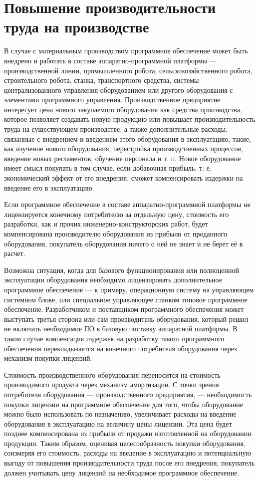 \documentclass{article}
\begin{document}
\section*{Повышение производительности труда на производстве}

В случае с материальным производством программное обеспечение может быть внедрено и работать в составе аппаратно-программной платформы — производственной линии, промышленного робота, сельскохозяйственного робота, строительного робота, станка, транспортного средства, системы централизованного управления оборудованием или другого оборудования с элементами программного управления. Производственное предприятие интересует цена нового закупаемого оборудования как средства производства, которое позволяет создавать новую продукцию или повышает производительность труда на существующем производстве, а также дополнительные расходы, связанные с внедрением и введением этого оборудования в эксплуатацию, такие, как изучение нового оборудования, перестройка производственных процессов, введение новых регламентов, обучение персонала и т. п. Новое оборудование имеет смысл покупать в том случае, если добавочная прибыль, т. е. экономический эффект от его внедрения, сможет компенсировать издержки на введение его в эксплуатацию.

Если программное обеспечение в составе аппаратно-программной платформы не лицензируется конечному потребителю за отдельную цену, стоимость его разработки, как и прочих инженерно-конструкторских работ, будет компенсирована производителю оборудования из прибыли от проданного оборудования, покупатель оборудования ничего о ней не знает и не берет её в расчет.

Возможна ситуация, когда для базового функционирования или полноценной эксплуатации оборудования необходимо лицензировать дополнительное программное обеспечение — к примеру, операционную систему на управляющем системном блоке, или специальное управляющее станком типовое программное обеспечение. Разработчиком и поставщиком программного обеспечения может выступать третья сторона или сам производитель оборудования, который решил не включать необходимое ПО в базовую поставку аппаратной платформы. В таком случае компенсация издержек на разработку такого программного обеспечения перекладывается на конечного потребителя оборудования через механизм покупки лицензий.

Стоимость производственного оборудования переносится на стоимость производимого продукта через механизм амортизации. С точки зрения потребителя оборудования — производственного предприятия, — необходимость покупки лицензии на программное обеспечение для того, чтобы оборудование можно было использовать по назначению, увеличивает расходы на введение оборудования в эксплуатацию на величину цены лицензии. Эта цена будет позднее компенсирована из прибыли от продажи изготовленной на оборудовании продукции. Таким образом, оценивая целесообразность покупки оборудования, соизмеряя его стоимость, расходы на введение в эксплуатацию и потенциальную выгоду от повышения производительности труда после его внедрения, покупатель должен учитывать цену лицензий на необходимое программное обеспечение.
\end{document}
